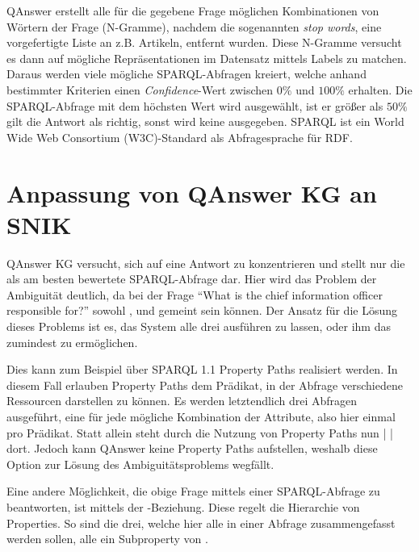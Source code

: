 \documentclass[utf8,biblatex]{lni}
\begin{document}
QAnswer erstellt alle für die gegebene Frage möglichen Kombinationen von Wörtern der Frage (N-Gramme), nachdem die sogenannten \emph{stop words}, eine vorgefertigte Liste an z.B. Artikeln, entfernt wurden.
Diese N-Gramme versucht es dann auf mögliche Repräsentationen im Datensatz mittels Labels zu matchen.
Daraus werden viele mögliche SPARQL-Abfragen kreiert, welche anhand bestimmter Kriterien einen \emph{Confidence}-Wert zwischen $0\%$ und $100\%$ erhalten.
Die SPARQL-Abfrage mit dem höchsten Wert wird ausgewählt, ist er größer als $50\%$ gilt die Antwort als richtig, sonst wird keine ausgegeben.
SPARQL ist ein World Wide Web Consortium (W3C)-Standard als Abfragesprache für RDF.

\section{Anpassung von QAnswer KG an SNIK}

QAnswer KG versucht, sich auf eine Antwort zu konzentrieren und stellt nur die als am besten bewertete SPARQL-Abfrage dar.
Hier wird das Problem der Ambiguität deutlich, da bei der Frage \enquote{What is the chief information officer responsible for?} sowohl
,  und  gemeint sein können.
Der Ansatz für die Lösung dieses Problems ist es, das System alle drei ausführen zu lassen, oder ihm das zumindest zu ermöglichen.

Dies kann zum Beispiel über SPARQL 1.1 Property Paths realisiert werden.
In diesem Fall erlauben Property Paths dem Prädikat, in der Abfrage verschiedene Ressourcen darstellen zu können.
Es werden letztendlich drei Abfragen ausgeführt, eine für jede mögliche Kombination der Attribute, also hier einmal pro Prädikat.
Statt allein  steht durch die Nutzung von Property Paths nun  |  |  dort.
Jedoch kann QAnswer keine Property Paths aufstellen, weshalb diese Option zur Lösung des Ambiguitätsproblems wegfällt.

Eine andere Möglichkeit, die obige Frage mittels einer SPARQL-Abfrage zu beantworten, ist mittels der -Beziehung.
Diese regelt die Hierarchie von Properties.
So sind die drei, welche hier alle in einer Abfrage zusammengefasst werden sollen, alle ein Subproperty von .
\end{document}
